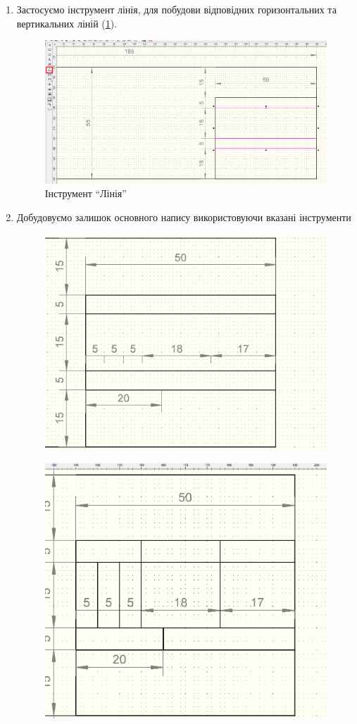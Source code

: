 \begin{enumerate}[leftmargin=*]
\item Застосуємо інструмент лінія, для побудови відповідних горизонтальних та вертикальних ліній
  (\ref{fig:lab2:line}).
  \begin{figure}[!htb]
    \centering \includegraphics[width=0.7\linewidth]{./images/lab2/fourth_step.png}
    \caption{Інструмент ``Лінія''}
    \label{fig:lab2:line}
  \end{figure}
  \FloatBarrier
\item Добудовуємо залишок основного напису використовуючи вказані інструменти
  \begin{figure}[!htb]
    \centering \includegraphics[width=0.7\linewidth]{./images/lab2/fifth_step.png}
    \caption{ \label{fig:lab2:fifth_step}}
  \end{figure}
  \begin{figure}[!htb]
    \centering \includegraphics[width=0.7\linewidth]{./images/lab2/sixth_step.png}

\end{figure}
\end{enumerate}
